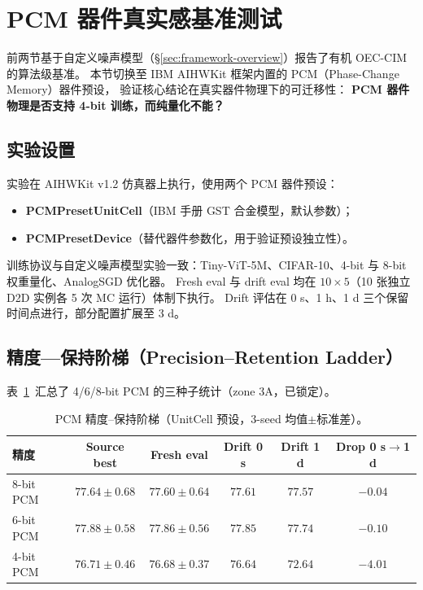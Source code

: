 \section{PCM 器件真实感基准测试}
\label{sec:pcm-benchmark}

前两节基于自定义噪声模型（\S\ref{sec:framework-overview}）报告了有机 OEC-CIM 的算法级基准。
本节切换至 IBM AIHWKit 框架内置的 PCM（Phase-Change Memory）器件预设，
验证核心结论在真实器件物理下的可迁移性：
\textbf{PCM 器件物理是否支持 4-bit 训练，而纯量化不能？}

\subsection{实验设置}

实验在 AIHWKit v1.2 仿真器上执行，使用两个 PCM 器件预设：
\begin{itemize}
    \item \textbf{PCMPresetUnitCell}（IBM 手册 GST 合金模型，默认参数）；
    \item \textbf{PCMPresetDevice}（替代器件参数化，用于验证预设独立性）。
\end{itemize}
训练协议与自定义噪声模型实验一致：Tiny-ViT-5M、CIFAR-10、4-bit 与 8-bit 权重量化、AnalogSGD 优化器。
Fresh eval 与 drift eval 均在 $10 \times 5$（10 张独立 D2D 实例各 5 次 MC 运行）体制下执行。
Drift 评估在 0 s、1 h、1 d 三个保留时间点进行，部分配置扩展至 3 d。

\subsection{精度—保持阶梯（Precision--Retention Ladder）}

表~\ref{tab:pcm-precision-ladder}~汇总了 4/6/8-bit PCM 的三种子统计（zone 3A，已锁定）。

\begin{table}[htbp]
\centering
\caption{PCM 精度--保持阶梯（UnitCell 预设，3-seed 均值$\pm$标准差）。}
\label{tab:pcm-precision-ladder}
\begin{tabular}{@{}lccccc@{}}
\toprule
\textbf{精度} & \textbf{Source best} & \textbf{Fresh eval} & \textbf{Drift 0 s} & \textbf{Drift 1 d} & \textbf{Drop 0 s$\to$1 d} \\
\midrule
8-bit PCM & $77.64 \pm 0.68$ & $77.60 \pm 0.64$ & $77.61$ & $77.57$ & $-0.04$ \\
6-bit PCM & $77.88 \pm 0.58$ & $77.86 \pm 0.56$ & $77.85$ & $77.74$ & $-0.10$ \\
4-bit PCM & $76.71 \pm 0.46$ & $76.68 \pm 0.37$ & $76.64$ & $72.64$ & $\mathbf{-4.01}$ \\
\bottomrule
\end{tabular}
\end{table}

